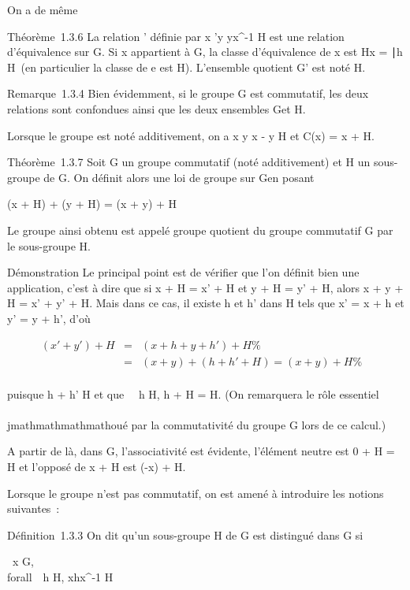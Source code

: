On a de même

Théorème~1.3.6 La relation ' définie par x 'y
\Leftrightarrow yx^-1 \in H est une relation
d'équivalence sur G. Si x appartient à G, la classe d'équivalence de x
est Hx = \hx∣h \in
H\ (en particulier la classe de e est H). L'ensemble
quotient G\diagup{}' est noté H\diagdownG.

Remarque~1.3.4 Bien évidemment, si le groupe G est commutatif, les deux
relations sont confondues ainsi que les deux ensembles G\diagupH et H\diagdownG.

Lorsque le groupe est noté additivement, on a x  y
\Leftrightarrow x - y \in H et C(x) = x + H.

Théorème~1.3.7 Soit G un groupe commutatif (noté additivement) et H un
sous-groupe de G. On définit alors une loi de groupe sur G\diagupH en posant

(x + H) + (y + H) = (x + y) + H

Le groupe ainsi obtenu est appelé groupe quotient du groupe commutatif G
par le sous-groupe H.

Démonstration Le principal point est de vérifier que l'on définit bien
une application, c'est à dire que si x + H = x' + H et y + H = y' + H,
alors x + y + H = x' + y' + H. Mais dans ce cas, il existe h et h' dans
H tels que x' = x + h et y' = y + h', d'où

\begin{align*} (x' + y') + H& =& (x + h + y + h')
+ H \%& \\ & =& (x + y) + (h + h' + H)
= (x + y) + H\%& \\
\end{align*}

puisque h + h' \in H et que \forall~~h \in H, h + H = H.
(On remarquera le rôle essentiel \\\\jmathmathmathmathoué par la commutativité du groupe G
lors de ce calcul.)

A partir de là, dans G\diagupH, l'associativité est évidente, l'élément neutre
est 0 + H = H et l'opposé de x + H est (-x) + H.

Lorsque le groupe n'est pas commutatif, on est amené à introduire les
notions suivantes~:

Définition~1.3.3 On dit qu'un sous-groupe H de G est distingué dans G si

\forall~x \in G,\\forall~~h \in H,
xhx^-1 \in H

